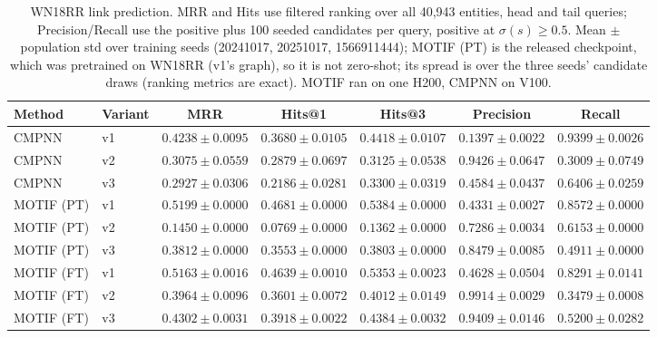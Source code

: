 \begin{table}[t]
\centering
\small
\begin{tabular}{||l||l||c|c|c||c|c||}
\hline
\textbf{Method} & \textbf{Variant} & \textbf{MRR} & \textbf{Hits@1} & \textbf{Hits@3} & \textbf{Precision} & \textbf{Recall} \\
\hline\hline
CMPNN & v1 & $0.4238 \pm 0.0095$ & $0.3680 \pm 0.0105$ & $0.4418 \pm 0.0107$ & $0.1397 \pm 0.0022$ & $0.9399 \pm 0.0026$ \\
\hline
CMPNN & v2 & $0.3075 \pm 0.0559$ & $0.2879 \pm 0.0697$ & $0.3125 \pm 0.0538$ & $0.9426 \pm 0.0647$ & $0.3009 \pm 0.0749$ \\
\hline
CMPNN & v3 & $0.2927 \pm 0.0306$ & $0.2186 \pm 0.0281$ & $0.3300 \pm 0.0319$ & $0.4584 \pm 0.0437$ & $0.6406 \pm 0.0259$ \\
\hline
\hline
MOTIF (PT) & v1 & $0.5199 \pm 0.0000$ & $0.4681 \pm 0.0000$ & $0.5384 \pm 0.0000$ & $0.4331 \pm 0.0027$ & $0.8572 \pm 0.0000$ \\
\hline
MOTIF (PT) & v2 & $0.1450 \pm 0.0000$ & $0.0769 \pm 0.0000$ & $0.1362 \pm 0.0000$ & $0.7286 \pm 0.0034$ & $0.6153 \pm 0.0000$ \\
\hline
MOTIF (PT) & v3 & $0.3812 \pm 0.0000$ & $0.3553 \pm 0.0000$ & $0.3803 \pm 0.0000$ & $0.8479 \pm 0.0085$ & $0.4911 \pm 0.0000$ \\
\hline
\hline
MOTIF (FT) & v1 & $0.5163 \pm 0.0016$ & $0.4639 \pm 0.0010$ & $0.5353 \pm 0.0023$ & $0.4628 \pm 0.0504$ & $0.8291 \pm 0.0141$ \\
\hline
MOTIF (FT) & v2 & $0.3964 \pm 0.0096$ & $0.3601 \pm 0.0072$ & $0.4012 \pm 0.0149$ & $0.9914 \pm 0.0029$ & $0.3479 \pm 0.0008$ \\
\hline
MOTIF (FT) & v3 & $0.4302 \pm 0.0031$ & $0.3918 \pm 0.0022$ & $0.4384 \pm 0.0032$ & $0.9409 \pm 0.0146$ & $0.5200 \pm 0.0282$ \\
\hline
\end{tabular}
\caption{WN18RR link prediction. MRR and Hits use filtered ranking over all 40,943 entities, head and tail queries; Precision/Recall use the positive plus 100 seeded candidates per query, positive at $\sigma(s) \geq 0.5$. Mean $\pm$ population std over training seeds (20241017, 20251017, 1566911444); MOTIF (PT) is the released checkpoint, which was pretrained on WN18RR (v1's graph), so it is not zero-shot; its spread is over the three seeds' candidate draws (ranking metrics are exact). MOTIF ran on one H200, CMPNN on V100. }
\label{tab:wordnet_link_prediction_seed_performance}
\end{table}
